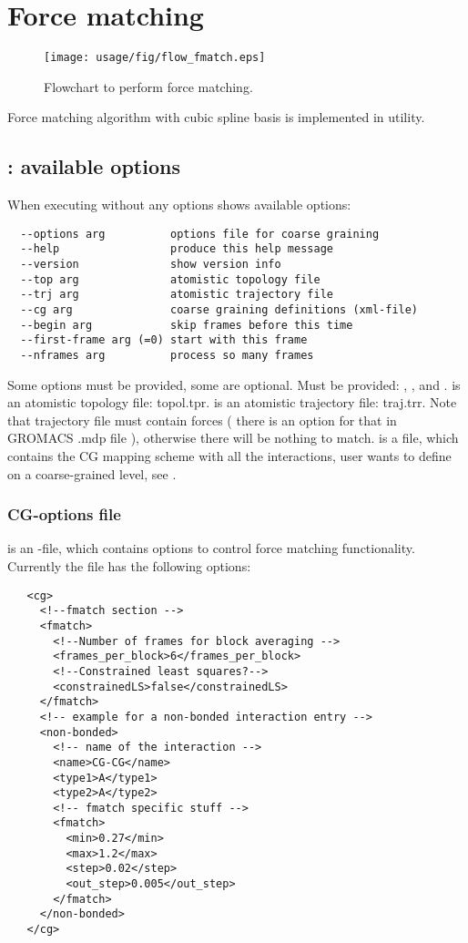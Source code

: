 \section{Force matching}
\sasha
\begin{figure}
   \centering
   \texttt{[image: usage/fig/flow\_fmatch.eps]}
   \caption{Flowchart to perform force matching.}
\end{figure}
Force matching algorithm with cubic spline basis is implemented in \csgfmatch utility.

\subsection{\csgfmatch: available options}
When executing without any options \csgfmatch shows available options:
\begin{verbatim}
  --options arg          options file for coarse graining
  --help                 produce this help message
  --version              show version info
  --top arg              atomistic topology file
  --trj arg              atomistic trajectory file
  --cg arg               coarse graining definitions (xml-file)
  --begin arg            skip frames before this time
  --first-frame arg (=0) start with this frame
  --nframes arg          process so many frames
\end{verbatim}
Some options must be provided, some are optional. Must be provided: \textbf{}, \textbf{}, \textbf{} and \textbf{}. \textbf{} is an atomistic topology file: topol.tpr. \textbf{} is an atomistic trajectory file: traj.trr. Note that trajectory file must contain forces ( there is an option for that in GROMACS .mdp file ), otherwise there will be nothing to match. \textbf{} is a file, which contains the CG mapping scheme with all the interactions, user wants to define on a coarse-grained level, see .

\subsubsection{CG-options file}
\textbf{} is an \xml-file, which contains options to control force matching functionality. 
Currently the file has the following options:
\begin{verbatim}
   <cg>
     <!--fmatch section -->
     <fmatch>
       <!--Number of frames for block averaging -->
       <frames_per_block>6</frames_per_block>
       <!--Constrained least squares?-->
       <constrainedLS>false</constrainedLS>
     </fmatch>
     <!-- example for a non-bonded interaction entry -->
     <non-bonded>
       <!-- name of the interaction -->
       <name>CG-CG</name>
       <type1>A</type1>
       <type2>A</type2>
       <!-- fmatch specific stuff -->
       <fmatch>
         <min>0.27</min>
         <max>1.2</max>
         <step>0.02</step>
         <out_step>0.005</out_step>
       </fmatch>
     </non-bonded>
   </cg>
\end{verbatim}

